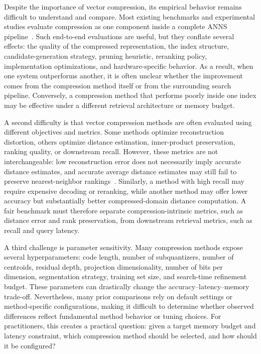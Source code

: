 \documentclass[sigconf]{acmart}
\begin{document}
Despite the importance of vector compression, its empirical behavior remains difficult to understand and compare. 
Most existing benchmarks and experimental studies evaluate compression as one component inside a complete ANNS pipeline~\cite{ann-benchmark,competition,tkde-survey,wang-survey,ilias-benchmark,martin-survey}. 
Such end-to-end evaluations are useful, but they conflate several effects: the quality of the compressed representation, the index structure, candidate-generation strategy, pruning heuristic, reranking policy, implementation optimizations, and hardware-specific behavior. 
As a result, when one system outperforms another, it is often unclear whether the improvement comes from the compression method itself or from the surrounding search pipeline. 
Conversely, a compression method that performs poorly inside one index may be effective under a different retrieval architecture or memory budget.

A second difficulty is that vector compression methods are often evaluated using different objectives and metrics. 
Some methods optimize reconstruction distortion, others optimize distance estimation, inner-product preservation, ranking quality, or downstream recall. 
However, these metrics are not interchangeable: low reconstruction error does not necessarily imply accurate distance estimates, and accurate average distance estimates may still fail to preserve nearest-neighbor rankings~\cite{scann,rabitq,li2025saq}. 
Similarly, a method with high recall may require expensive decoding or reranking, while another method may offer lower accuracy but substantially better compressed-domain distance computation. 
A fair benchmark must therefore separate compression-intrinsic metrics, such as distance error and rank preservation, from downstream retrieval metrics, such as recall and query latency.

A third challenge is parameter sensitivity. 
Many compression methods expose several hyperparameters: code length, number of subquantizers, number of centroids, residual depth, projection dimensionality, number of bits per dimension, segmentation strategy, training set size, and search-time refinement budget. 
These parameters can drastically change the accuracy--latency--memory trade-off. 
Nevertheless, many prior comparisons rely on default settings or method-specific configurations, making it difficult to determine whether observed differences reflect fundamental method behavior or tuning choices. 
For practitioners, this creates a practical question: given a target memory budget and latency constraint, which compression method should be selected, and how should it be configured?
\end{document}
